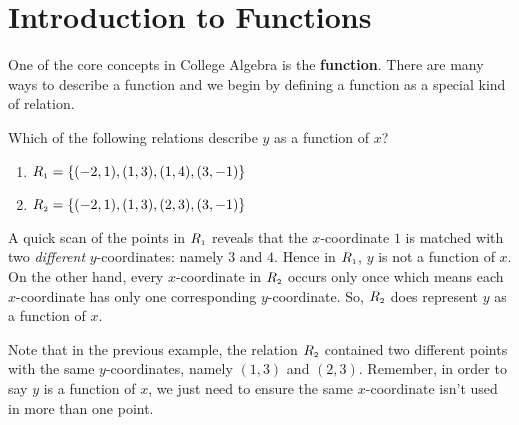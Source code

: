 \section{Introduction to Functions}
\label{IntrotoFunctions}

One of the core concepts in College Algebra is the \textbf{function}.  There are many ways to describe a function and we begin by defining a function as a special kind of relation.

\medskip





\medskip

{
Which of the following relations describe $y$ as a function of $x$?

\begin{multicols}{2}

\begin{enumerate}

\item  $R_{\mbox{\tiny$1$}} = \{ (-2,1), (1,3), (1,4), (3,-1) \}$

\item  $R_{\mbox{\tiny$2$}} = \{ (-2,1), (1,3), (2,3), (3,-1) \}$

\end{enumerate}

\end{multicols}
}
{ 
A quick scan of the points in $R_{\mbox{\tiny$1$}}$ reveals that the $x$-coordinate $1$ is matched with two \emph{different} $y$-coordinates:  namely $3$ and $4$.  Hence in $R_{\mbox{\tiny$1$}}$, $y$ is not a function of $x$.  On the other hand, every $x$-coordinate in $R_{\mbox{\tiny$2$}}$ occurs only once which means each $x$-coordinate has only one corresponding $y$-coordinate.  So, $R_{\mbox{\tiny$2$}}$  does represent $y$ as a function of $x$.
}

\smallskip

Note that in the previous example, the relation $R_{\mbox{\tiny$2$}}$ contained two different points with the same $y$-coordinates, namely $(1,3)$ and $(2,3)$. Remember, in order to say $y$ is a function of $x$, we just need to ensure the same $x$-coordinate isn't used in more than one point.

